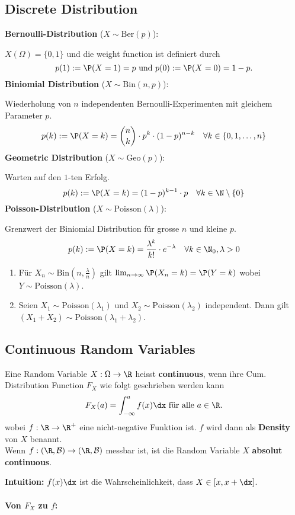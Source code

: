 \subsection{Discrete Distribution}
\textbf{Bernoulli-Distribution} ($X \sim \text{Ber}(p)$): 

$X(\Omega)= \{0, 1\}$ und die weight function ist definiert durch
$$p(1):= \P(X = 1) = p \text{ und } p(0):=\P(X = 0) = 1 - p.$$
\textbf{Biniomial Distribution} ($X \sim \text{Bin}(n, p)$): 

Wiederholung von $n$ independenten Bernoulli-Experimenten mit gleichem Parameter $p$. 
$$p(k):= \P(X = k) = \binom{n}{k} \cdot p^k \cdot (1-p)^{n-k} \quad \forall k \in \{0,1,\ldots, n\}$$
\textbf{Geometric Distribution} ($X \sim \text{Geo}(p)$): 

Warten auf den $1$-ten Erfolg. 
$$p(k):= \P(X = k) = (1-p)^{k-1}\cdot p \quad \forall k \in \N\setminus\{0\}$$
\textbf{Poisson-Distribution} ($X \sim \text{Poisson}(\lambda)$): 

Grenzwert der Biniomial Distribution für grosse $n$ und kleine $p$. 
$$p(k) := \P(X = k) = \frac{\lambda^k}{k!}\cdot e^{-\lambda} \quad \forall k \in \N_0, \lambda > 0$$
\begin{enumerate}
    \item Für $X_n \sim \text{Bin}(n, \frac{\lambda}{n})$ gilt $\lim_{n \to \infty}\P(X_n = k) = \P(Y = k)$ wobei $Y \sim \text{Poisson}(\lambda)$.
    \item Seien $X_1 \sim \text{Poisson}(\lambda_1)$ und $X_2 \sim \text{Poisson}(\lambda_2)$ independent. Dann gilt $(X_1 + X_2) \sim \text{Poisson}(\lambda_1 +\lambda_2)$.
\end{enumerate}

\subsection{Continuous Random Variables}
\begin{mainbox}{}
    Eine Random Variable $X: \Omega \to \R$ heisst \textbf{continuous}, wenn ihre Cum. Distribution Function $F_X$ wie folgt geschrieben werden kann
    $$F_X(a) = \int_{-\infty}^{a}f(x)\dx \text{ für alle }a \in \R.$$
    wobei $f: \R \to \R^+$ eine nicht-negative Funktion ist. $f$ wird dann als \textbf{Density} von $X$ benannt.\\
    Wenn $f: (\R, \mathcal{B}) \to (\R, \mathcal{B})$ messbar ist, ist die Random Variable $X$ \textbf{absolut continuous}.
\end{mainbox}
\textbf{Intuition:} $f(x)\dx$ ist die Wahrscheinlichkeit, dass $X \in [x, x + \dx]$.
\\ \\
\textbf{Von $F_X$ zu $f$:} 

